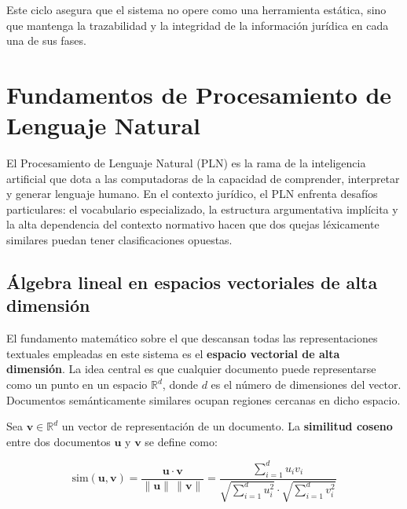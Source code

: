 Este ciclo asegura que el sistema no opere como una herramienta estática, sino
que mantenga la trazabilidad y la integridad de la información jurídica en cada
una de sus fases.

\section{Fundamentos de Procesamiento de Lenguaje Natural}

El Procesamiento de Lenguaje Natural (PLN) es la rama de la inteligencia
artificial que dota a las computadoras de la capacidad de comprender, interpretar
y generar lenguaje humano. En el contexto jurídico, el PLN enfrenta desafíos
particulares: el vocabulario especializado, la estructura argumentativa implícita
y la alta dependencia del contexto normativo hacen que dos quejas léxicamente
similares puedan tener clasificaciones opuestas.

\subsection{Álgebra lineal en espacios vectoriales de alta dimensión}

El fundamento matemático sobre el que descansan todas las representaciones
textuales empleadas en este sistema es el \textbf{espacio vectorial de alta
dimensión}. La idea central es que cualquier documento puede representarse como
un punto en un espacio $\mathbb{R}^d$, donde $d$ es el número de dimensiones
del vector. Documentos semánticamente similares ocupan regiones cercanas en dicho
espacio.

Sea $\mathbf{v} \in \mathbb{R}^d$ un vector de representación de un documento.
La \textbf{similitud coseno} entre dos documentos $\mathbf{u}$ y $\mathbf{v}$
se define como:

\begin{equation}
  \text{sim}(\mathbf{u}, \mathbf{v})
  = \frac{\mathbf{u} \cdot \mathbf{v}}{\|\mathbf{u}\| \, \|\mathbf{v}\|}
  = \frac{\displaystyle\sum_{i=1}^{d} u_i v_i}
         {\sqrt{\displaystyle\sum_{i=1}^{d} u_i^2}
          \cdot \sqrt{\displaystyle\sum_{i=1}^{d} v_i^2}}
  \label{eq:coseno}
\end{equation}


